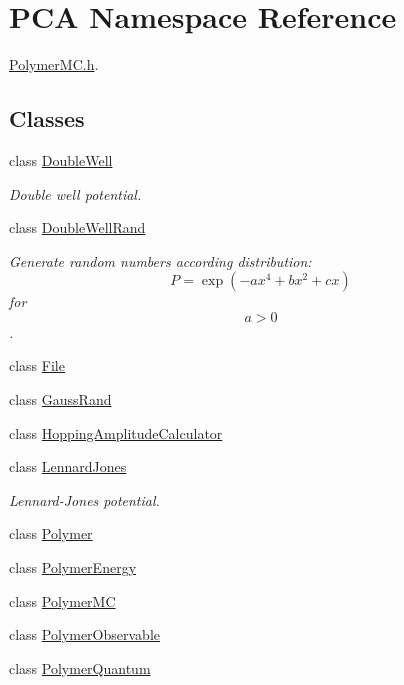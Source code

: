 \hypertarget{namespace_p_c_a}{}\section{P\+CA Namespace Reference}
\label{namespace_p_c_a}


\hyperlink{_polymer_m_c_8h}{Polymer\+M\+C.\+h}.  


\subsection*{Classes}
\begin{DoxyCompactItemize}
\item 
class \hyperlink{class_p_c_a_1_1_double_well}{Double\+Well}
\begin{DoxyCompactList}\small\item\em Double well potential. \end{DoxyCompactList}\item 
class \hyperlink{class_p_c_a_1_1_double_well_rand}{Double\+Well\+Rand}
\begin{DoxyCompactList}\small\item\em Generate random numbers according distribution\+: \[ P = \exp(-ax^4+bx^2+cx) \] for \[ a>0 \]. \end{DoxyCompactList}\item 
class \hyperlink{class_p_c_a_1_1_file}{File}
\item 
class \hyperlink{class_p_c_a_1_1_gauss_rand}{Gauss\+Rand}
\item 
class \hyperlink{class_p_c_a_1_1_hopping_amplitude_calculator}{Hopping\+Amplitude\+Calculator}
\item 
class \hyperlink{class_p_c_a_1_1_lennard_jones}{Lennard\+Jones}
\begin{DoxyCompactList}\small\item\em Lennard-\/\+Jones potential. \end{DoxyCompactList}\item 
class \hyperlink{class_p_c_a_1_1_polymer}{Polymer}
\item 
class \hyperlink{class_p_c_a_1_1_polymer_energy}{Polymer\+Energy}
\item 
class \hyperlink{class_p_c_a_1_1_polymer_m_c}{Polymer\+MC}
\item 
class \hyperlink{class_p_c_a_1_1_polymer_observable}{Polymer\+Observable}
\item 
class \hyperlink{class_p_c_a_1_1_polymer_quantum}{Polymer\+Quantum}
\item 

\end{DoxyCompactItemize}
